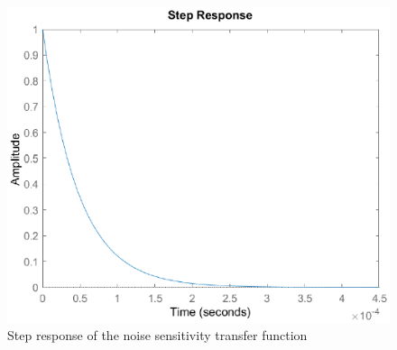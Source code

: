 \documentclass{report}
\begin{document}
\begin{figure}[h]
\centering
\includegraphics[scale=0.6]{motor_noise_sensitivity_step_response}	
\caption{Step response of the noise sensitivity transfer function}
\label{fig:motor_noise_sensitivity_step_response}
\end{figure}







 

\end{document}
